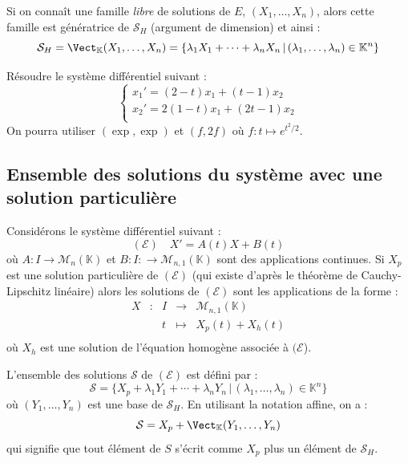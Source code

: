 \documentclass[french,11pt,twoside]{VcCours}
\begin{document}
\begin{Remarque}{} Si on connaît une famille \emph{libre} de solutions de $E$, $(X_1, \ldots, X_n)$, alors cette famille est génératrice de $\mathcal{S}_H$ (argument de dimension) et ainsi :
$$ \mathcal{S}_H= \Vect_{\mathbb{K}}(X_1, \ldots, X_n) = \lbrace \lambda_1 X_1 + \cdots + \lambda_n X_n \, \vert \, (\lambda_1, \ldots, \lambda_n) \in \mathbb{K}^n \rbrace$$
\end{Remarque}

\begin{ApplicationDirecte}{}Résoudre le système différentiel suivant : 
$$ \left\lbrace \begin{array}{lclll}
x_1'= (2-t)x_1+(t-1) x_2 \\
x_2'= 2(1-t)x_1 +(2t-1)x_2 \\
\end{array}\right.$$
On pourra utiliser $(\exp,\exp)$ et $(f,2f)$ où $f : t \mapsto e^{t^2/2}$.
\end{ApplicationDirecte}
\subsection{Ensemble des solutions du système avec une solution particulière} 
\begin{Proposition}{}\label{sol}
Considérons le système différentiel suivant : 
$$ (\mathcal{E}) \quad X'=A(t)X+B(t)$$
où $A : I \rightarrow \mathcal{M}_n(\mathbb{K})$ et $B : I : \rightarrow \mathcal{M}_{n,1}(\mathbb{K})$ sont des applications continues. Si $X_p$ est une solution particulière de $(\mathcal{E})$ (qui existe d'après le théorème de Cauchy-Lipschitz linéaire) alors les solutions de $(\mathcal{E})$ sont les applications de la forme :
$$ \begin{array}{llcll}
X &:&  I & \rightarrow & \mathcal{M}_{n,1}(\mathbb{K}) \\
& & t & \mapsto & X_p(t) + X_h(t) \\
\end{array}$$
où $X_h$ est une solution de l'équation homogène associée à $(\mathcal{E}$).
\end{Proposition}


\begin{Demonstration}{}
\vspace*{4cm}
\end{Demonstration}

\begin{Remarque}{} L'ensemble des solutions $\mathcal{S}$ de $(\mathcal{E})$ est défini par :
$$ \mathcal{S} = \lbrace X_p + \lambda_1 Y_1 + \cdots + \lambda_n Y_n  \, \vert \, (\lambda_1, \ldots, \lambda_n) \in \mathbb{K}^n \rbrace$$
où $(Y_1, \ldots, Y_n)$ est une base de $\mathcal{S}_H$. En utilisant la notation affine, on a :
$$  \mathcal{S} =X_p + \Vect_{\mathbb{K}}(Y_1, \ldots, Y_n)$$
qui signifie que tout élément de $S$ s'écrit comme $X_p$ plus un élément de $\mathcal{S}_H$.
\end{Remarque}
\end{document}
